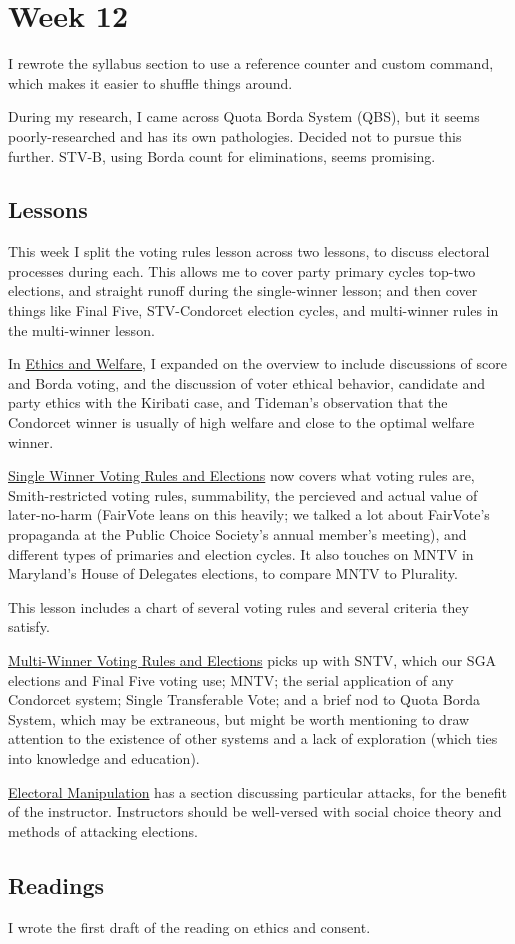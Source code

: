 \section{Week 12}

I rewrote the syllabus section to use a reference counter and custom command, which makes it easier to shuffle things around.

During my research, I came across Quota Borda System (QBS), but it seems poorly-researched and has its own pathologies.  Decided not to pursue this further.  STV-B, using Borda count for eliminations, seems promising.

\subsection{Lessons}

This week I split the voting rules lesson across two lessons, to discuss electoral processes during each.  This allows me to cover party primary cycles top-two elections, and straight runoff during the single-winner lesson; and then cover things like Final Five, STV-Condorcet election cycles, and multi-winner rules in the multi-winner lesson.

In \hyperref[cur:ethics]{Ethics and Welfare}, I expanded on the overview to include discussions of score and Borda voting, and the discussion of voter ethical behavior, candidate and party ethics with the Kiribati case, and Tideman's observation that the Condorcet winner is usually of high welfare and close to the optimal welfare winner.

\hyperref[cur:single-winner-voting-rules]{Single Winner Voting Rules and Elections} now covers what voting rules are, Smith-restricted voting rules, summability, the percieved and actual value of later-no-harm (FairVote leans on this heavily; we talked a lot about FairVote's propaganda at the Public Choice Society's annual member's meeting), and different types of primaries and election cycles.  It also touches on MNTV in Maryland's House of Delegates elections, to compare MNTV to Plurality.

This lesson includes a chart of several voting rules and several criteria they satisfy.

\hyperref[cur:multi-winner-voting-rules]{Multi-Winner Voting Rules and Elections} picks up with SNTV, which our SGA elections and Final Five voting use; MNTV; the serial application of any Condorcet system; Single Transferable Vote; and a brief nod to Quota Borda System, which may be extraneous, but might be worth mentioning to draw attention to the existence of other systems and a lack of exploration (which ties into knowledge and education).

\hyperref[cur:manipulation]{Electoral Manipulation} has a section discussing particular attacks, for the benefit of the instructor.  Instructors should be well-versed with social choice theory and methods of attacking elections.

\subsection{Readings}
I wrote the first draft of the reading on ethics and consent.

